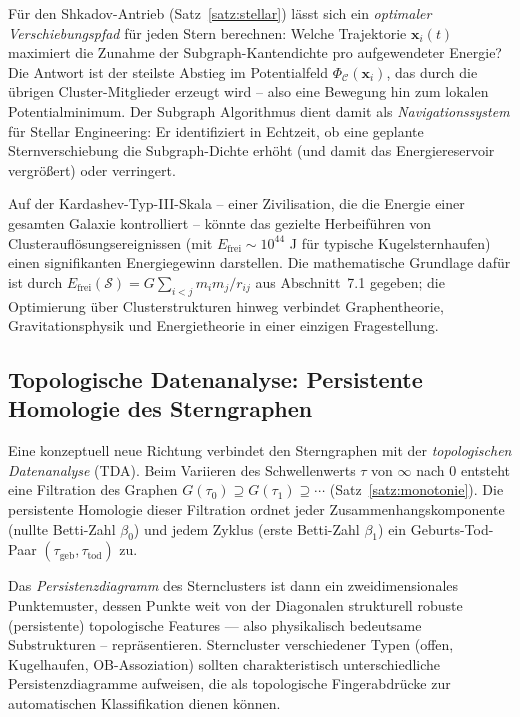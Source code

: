 ﻿\documentclass[a4paper,12pt]{report}
\theoremstyle{definition}
\begin{document}
Für den Shkadov-Antrieb (Satz~\ref{satz:stellar}) lässt sich ein \emph{optimaler Verschiebungspfad} für jeden Stern berechnen: Welche Trajektorie $\mathbf{x}_i(t)$ maximiert die Zunahme der Subgraph-Kantendichte pro aufgewendeter Energie? Die Antwort ist der steilste Abstieg im Potentialfeld $\Phi_\mathcal{C}(\mathbf{x}_i)$, das durch die übrigen Cluster-Mitglieder erzeugt wird -- also eine Bewegung hin zum lokalen Potentialminimum. Der Subgraph Algorithmus dient damit als \emph{Navigationssystem} für Stellar Engineering: Er identifiziert in Echtzeit, ob eine geplante Sternverschiebung die Subgraph-Dichte erhöht (und damit das Energiereservoir vergrößert) oder verringert.

Auf der Kardashev-Typ-III-Skala -- einer Zivilisation, die die Energie einer gesamten Galaxie kontrolliert -- könnte das gezielte Herbeiführen von Clusterauflösungsereignissen (mit $E_\mathrm{frei} \sim 10^{44}$ J für typische Kugelsternhaufen) einen signifikanten Energiegewinn darstellen. Die mathematische Grundlage dafür ist durch $E_\mathrm{frei}(\mathcal{S}) = G \sum_{i<j} m_i m_j / r_{ij}$ aus Abschnitt~7.1 gegeben; die Optimierung über Clusterstrukturen hinweg verbindet Graphentheorie, Gravitationsphysik und Energietheorie in einer einzigen Fragestellung.

\subsection{Topologische Datenanalyse: Persistente Homologie des Sterngraphen}

Eine konzeptuell neue Richtung verbindet den Sterngraphen mit der \emph{topologischen Datenanalyse} (TDA). Beim Variieren des Schwellenwerts $\tau$ von $\infty$ nach $0$ entsteht eine Filtration des Graphen $G(\tau_0) \supseteq G(\tau_1) \supseteq \cdots$ (Satz~\ref{satz:monotonie}). Die persistente Homologie dieser Filtration ordnet jeder Zusammenhangskomponente (nullte Betti-Zahl $\beta_0$) und jedem Zyklus (erste Betti-Zahl $\beta_1$) ein Geburts-Tod-Paar $(\tau_\mathrm{geb}, \tau_\mathrm{tod})$ zu.

Das \emph{Persistenzdiagramm} des Sternclusters ist dann ein zweidimensionales Punktemuster, dessen Punkte weit von der Diagonalen strukturell robuste (persistente) topologische Features --- also physikalisch bedeutsame Substrukturen -- repräsentieren. Sterncluster verschiedener Typen (offen, Kugelhaufen, OB-Assoziation) sollten charakteristisch unterschiedliche Persistenzdiagramme aufweisen, die als topologische Fingerabdrücke zur automatischen Klassifikation dienen können.
\end{document}
